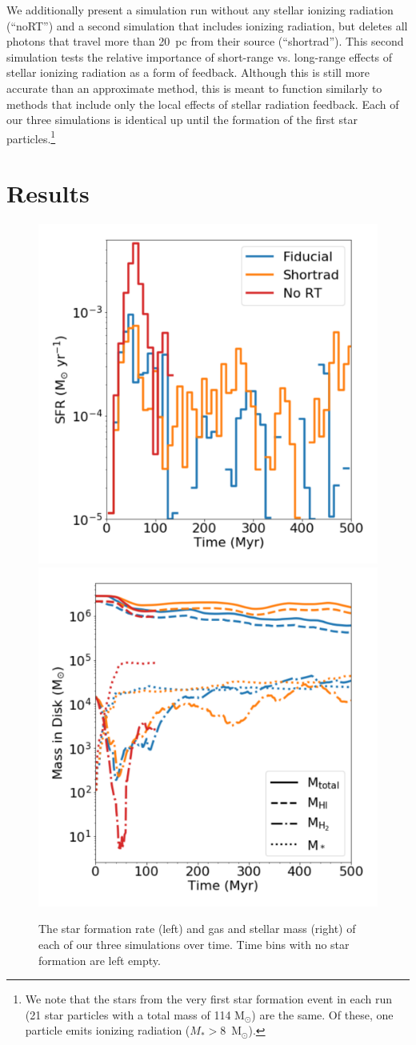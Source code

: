\documentclass[twocolumn]{aastex62}
\begin{document}
We additionally present a simulation run without any stellar ionizing radiation (``noRT'') and a second simulation that includes ionizing radiation, but deletes all photons that travel more than 20~pc from their source (``shortrad''). This second simulation tests the relative importance of short-range vs. long-range effects of stellar ionizing radiation as a form of feedback. Although this is still more accurate than an approximate method, this is meant to function similarly to methods that include only the local effects of stellar radiation feedback. Each of our three simulations is identical up until the formation of the first star particles.\footnote{We note that the stars from the very first star formation event in each run (21 star particles with a total mass of 114 M$_{\odot}$) are the same. Of these, one particle emits ionizing radiation ($M_* > 8 $~M$_{\odot}$).}

\section{Results} \label{sec:results}

\begin{figure}
\centering
\includegraphics[width=0.49\linewidth]{sfr}
\includegraphics[width=0.49\linewidth]{mass}
\caption{The star formation rate (left) and gas and stellar mass (right) of each of our three simulations over time. Time bins with no star formation are left empty.}
\label{fig:sfr_mass_evolution}
\end{figure}
\end{document}
